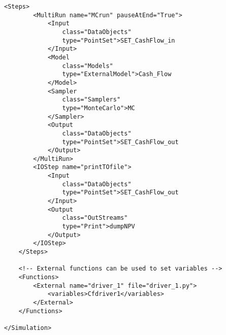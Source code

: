 \begin{lstlisting}[style=XML,morekeywords={anAttribute},caption=Raven input example using CashFlow external model., label=lst:RAVENExample]
    <Steps>
        <MultiRun name="MCrun" pauseAtEnd="True">
            <Input
                class="DataObjects"
                type="PointSet">SET_CashFlow_in
            </Input>
            <Model
                class="Models"
                type="ExternalModel">Cash_Flow
            </Model>
            <Sampler
                class="Samplers"
                type="MonteCarlo">MC
            </Sampler>
            <Output
                class="DataObjects"
                type="PointSet">SET_CashFlow_out
            </Output>
        </MultiRun>
        <IOStep name="printTOfile">
            <Input
                class="DataObjects"
                type="PointSet">SET_CashFlow_out
            </Input>
            <Output
                class="OutStreams"
                type="Print">dumpNPV
            </Output>
        </IOStep>
    </Steps>

    <!-- External functions can be used to set variables -->
    <Functions>
        <External name="driver_1" file="driver_1.py">
            <variables>Cfdriver1</variables>
        </External>
    </Functions>

</Simulation>
\end{lstlisting}

